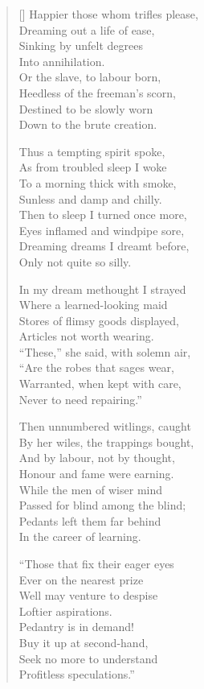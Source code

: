 \begin{verse}[\versewidth]
Happier those whom trifles please, \\
Dreaming out a life of ease, \\
Sinking by unfelt degrees \\
Into annihilation. \\
Or the slave, to labour born, \\
Heedless of the freeman's scorn, \\
Destined to be slowly worn \\
Down to the brute creation. 
 
Thus a tempting spirit spoke, \\
As from troubled sleep I woke \\
To a morning thick with smoke, \\
Sunless and damp and chilly. \\
Then to sleep I turned once more, \\
Eyes inflamed and windpipe sore, \\
Dreaming dreams I dreamt before, \\
Only not quite so silly.
 
In my dream methought I strayed \\
Where a learned-looking maid \\
Stores of flimsy goods displayed, \\
Articles not worth wearing. \\
``These,'' she said, with solemn air, \\
``Are the robes that sages wear, \\
Warranted, when kept with care, \\
Never to need repairing.'' 
 
Then unnumbered witlings, caught \\
By her wiles, the trappings bought, \\
And by labour, not by thought, \\
Honour and fame were earning. \\
While the men of wiser mind \\
Passed for blind among the blind; \\
Pedants left them far behind \\
In the career of learning.
 
``Those that fix their eager eyes \\
Ever on the nearest prize \\
Well may venture to despise \\
Loftier aspirations. \\
Pedantry is in demand! \\
Buy it up at second-hand, \\
Seek no more to understand \\
Profitless speculations.''
 

\end{verse}
